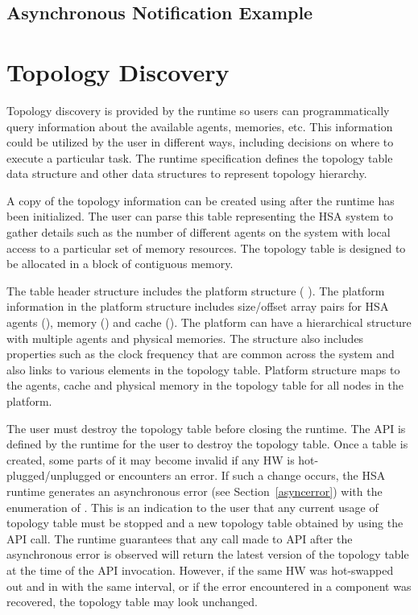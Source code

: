 \documentclass[draft]{book}
\newcommand{\mariotodo}[1]{\todo[color=CarnationPink]{#1}}
\begin{document}
\subsection{Asynchronous Notification Example}


\hypertarget{component}{}\section{Topology Discovery}
\label{topology}

Topology discovery is provided by the runtime so users can programmatically
query information about the available agents, memories, etc. This information
could be utilized by the user in different ways, including decisions on where to
execute a particular task. The runtime specification defines the topology table
data structure and other data structures to represent topology hierarchy.

A copy of the topology information can be created using
 after the runtime has been
initialized. The user can parse this table representing the HSA system to gather
details such as the number of different agents on the system with local access
to a particular set of memory resources. The topology table is designed to be
allocated in a block of contiguous memory.

The table header structure includes the platform structure (
). The platform information in the platform
structure includes size/offset array pairs for HSA agents
(), memory () and cache
(). The platform can have a hierarchical
structure with multiple agents and physical memories. The
 structure also includes properties such as the
clock frequency that are common across the system and also links to various
elements in the topology table. Platform structure maps to the agents, cache and
physical memory in the topology table for all nodes in the platform.

The user must destroy the topology table before closing the runtime. The
 API is defined by the runtime for the
user to destroy the topology table. Once a table is created, some parts of it
may become invalid if any HW is hot-plugged/unplugged or encounters an error. If
such a change occurs, the HSA runtime generates an asynchronous error (see
Section~\ref{asyncerror}) with the  enumeration of
\mariotodo{never defined}. This is an
indication to the user that any current usage of topology table must be stopped
and a new topology table obtained by using the
 API call. The runtime guarantees that any
call made to  API after the asynchronous
error is observed will return the latest version of the topology table at the
time of the API invocation. However, if the same HW was hot-swapped out and in
with the same interval, or if the error encountered in a component was
recovered, the topology table may look unchanged.
\end{document}
